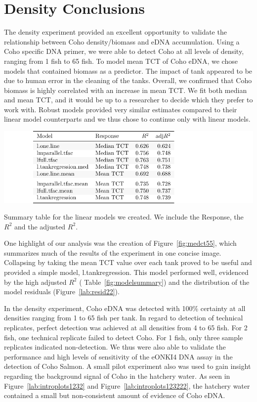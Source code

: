 \section{Density Conclusions}


 The density experiment provided an excellent opportunity to validate the relationship between Coho density/biomass and eDNA accumulation. Using a Coho specific DNA primer, we were able to detect Coho at all levels of density, ranging from 1 fish to 65 fish. To model mean TCT of Coho eDNA, we chose models that contained biomass as a predictor. The impact of tank appeared to be due to human error in the cleaning of the tanks. Overall, we confirmed that Coho biomass is highly correlated with an increase in mean TCT. We fit both median and mean TCT, and it would be up to a researcher to decide which they prefer to work with. Robust models provided very similar estimates compared to their linear model counterparts and we thus chose to continue only with linear models.



\begin{table}[H]
\includegraphics{Chapter3Images/densitymodelsummary.pdf}
\caption{Summary table for the linear models we created. We include the Response, the $R^{2}$ and the adjusted $R^{2}$.}
\label{fig:modelsummary}
\end{table}
\vspace{5mm}

One highlight of our analysis was the creation of Figure~\ref{fig:medct55}, which summarizes much of the results of the experiment in one concise image. Collapsing by taking the mean TCT value over each tank proved to be useful and provided a simple model, l.tankregression. This model performed well, evidenced by the high adjusted $R^{2}$ ( Table~\ref{fig:modelsummary}) and the distribution of the model residuals (Figure~\ref{lab:resid22}). 

\vspace{5mm}

In the density experiment, Coho eDNA was detected with 100\%  certainty at all densities ranging from 1 to 65 fish per tank. In regard to detection of technical replicates, perfect detection was achieved at all densities from 4 to 65 fish. For 2 fish, one technical replicate failed to detect Coho. For 1 fish, only three sample replicates indicated non-detection. We thus were also able to validate the performance and high levels of sensitivity of the eONKI4 DNA assay in the detection of Coho Salmon. A small pilot experiment also was used to gain insight regarding the background signal of Coho in the hatchery water. As seen in Figure~\ref{lab:introplots1232} and Figure~\ref{lab:introplots123222}, the hatchery water contained a small but non-consistent amount of evidence of Coho eDNA.




